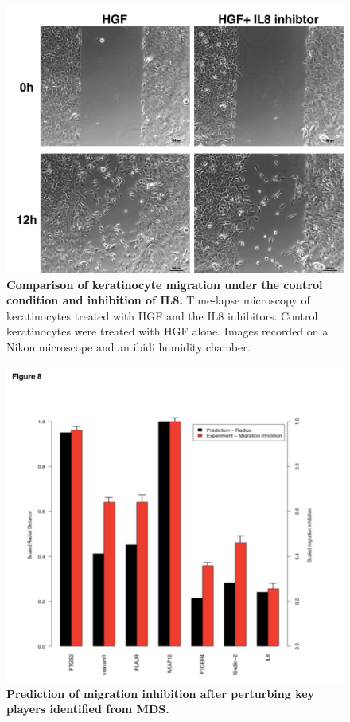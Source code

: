 \begin{figure}[!ht]
\begin{center}
\includegraphics[width=\textwidth]{scratch_assay.pdf}
\end{center}
\caption[Migration of keratinocytes]{
{\bf Comparison of keratinocyte migration under the control condition and 
inhibition of IL8.}
Time-lapse microscopy of keratinocytes treated with HGF and the IL8 inhibitors. 
Control keratinocytes were treated with HGF alone. Images recorded on a Nikon 
microscope and an ibidi humidity chamber.
}
\label{fig:scratch_assay}
\end{figure}

\begin{figure}[!ht]
\begin{center}
\includegraphics[width=\textwidth]{migration_prediction.pdf}
\end{center}
\caption[Prediction of migration inhibition after perturbing key players]{
{\bf Prediction of migration inhibition after perturbing key players identified
from MDS.} 
}
\label{fig:migration_prediction}
\end{figure}

